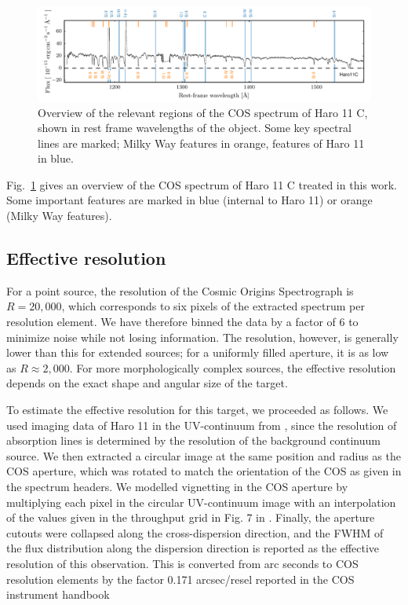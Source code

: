 \documentclass[twocolumn,]{aastex61}
\begin{document}
\begin{figure}
\centering
\includegraphics[]{./FullSpec.pdf}
\caption{Overview of the relevant regions of the COS spectrum of Haro 11
C, shown in rest frame wavelengths of the object. Some key spectral
lines are marked; Milky Way features in orange, features of Haro 11 in
blue.}\label{fig:fullspec}
\end{figure}

Fig.~\ref{fig:fullspec} gives an overview of the COS spectrum of Haro 11
C treated in this work. Some important features are marked in blue
(internal to Haro 11) or orange (Milky Way features).


\subsection{Effective resolution}\label{effective-resolution}

For a point source, the resolution of the Cosmic Origins Spectrograph is
$R=20,000$, which corresponds to six pixels of the extracted spectrum
per resolution element. We have therefore binned the data by a factor of
6 to minimize noise while not losing information. The resolution,
however, is generally lower than this for extended sources; for a
uniformly filled aperture, it is as low as $R\approx2,000$. For more
morphologically complex sources, the effective resolution depends on the
exact shape and angular size of the target.

To estimate the effective resolution for this target, we proceeded as
follows. We used imaging data of Haro 11 in the UV-continuum
from \citet{Ostlin2009, Hayes2009}, since the resolution of absorption
lines is determined by the resolution of the background continuum source. We 
then extracted a circular image at the same
position and radius as the COS aperture, which was rotated to match the
orientation of the COS as given in the spectrum headers. We modelled
vignetting in the COS aperture by multiplying each pixel in the circular
UV-continuum image with an interpolation of the values given in the
throughput grid in Fig. 7 in \citet{CosImaging}. Finally, the aperture
cutouts were collapsed along the cross-dispersion direction, and the
FWHM of the flux distribution along the dispersion direction is reported
as the effective resolution of this observation. This is converted from
arc seconds to COS resolution elements by the factor 0.171 arcsec/resel
reported in the COS instrument handbook \citep{CosHandbook}
\end{document}
